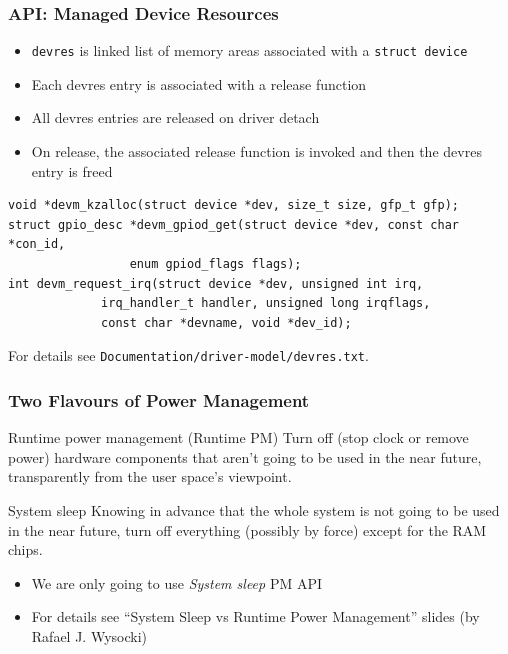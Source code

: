 \begin{frame}[containsverbatim]
  \frametitle{API: Managed Device Resources}

  \begin{itemize}
    \item \texttt{devres} is linked list of memory areas associated with a
          \texttt{struct device}
    \item Each devres entry is associated with a release function
    \item All devres entries are released on driver detach
    \item On release, the associated release function is invoked and then the
devres entry is freed
  \end{itemize}

  \begin{lstlisting}[style=c,numbers=none]
void *devm_kzalloc(struct device *dev, size_t size, gfp_t gfp);
struct gpio_desc *devm_gpiod_get(struct device *dev, const char *con_id,
				 enum gpiod_flags flags);
int devm_request_irq(struct device *dev, unsigned int irq,
		     irq_handler_t handler, unsigned long irqflags,
		     const char *devname, void *dev_id);
  \end{lstlisting}

  For details see \texttt{Documentation/driver-model/devres.txt}.
\end{frame}

\begin{frame}
  \frametitle{Two Flavours of Power Management}

  \begin{block}{Runtime power management (Runtime PM)}
Turn off (stop clock or remove power) hardware components that aren’t
going to be used in the near future, \alert{transparently} from the user space’s
viewpoint.
  \end{block}

  \begin{block}{System sleep}
Knowing in advance that \alert{the whole system} is not going to be used in the
near future, turn off \alert{everything} (possibly \alert{by force}) except for
the RAM chips.
  \end{block}

  \begin{itemize}
  \item We are only going to use \textit{System sleep} PM API
  \item For details see ``System Sleep vs Runtime Power Management'' slides
        (by Rafael J. Wysocki)
  \end{itemize}
\end{frame}

